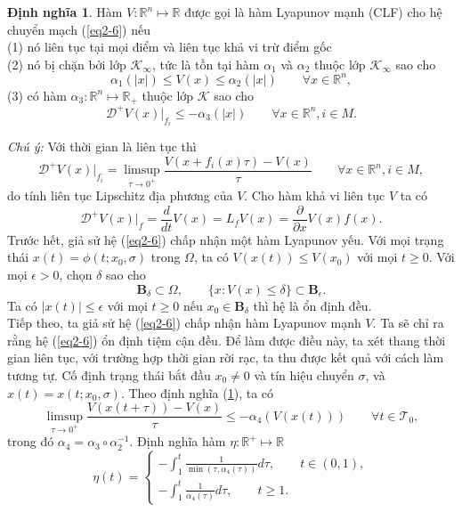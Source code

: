 \documentclass[14pt,a4paper,oneside]{report}		%
\theoremstyle{definition}
\newtheorem{define}[theorem]{Định nghĩa}
\begin{document}
\begin{define} \label{def2-4}
Hàm $V:\mathbb{R}^n\mapsto\mathbb{R}$ được gọi là hàm Lyapunov mạnh (CLF) cho hệ chuyển mạch (\ref{eq2-6}) nếu\\
(1) nó liên tục tại mọi điểm và liên tục khả vi trừ điểm gốc\\
(2) nó bị chặn bởi lớp $\mathcal{K}_\infty$, tức là tồn tại hàm $\alpha_1$ và $\alpha_2$ thuộc lớp $\mathcal{K}_\infty$ sao cho
$$\alpha_1(|x|)\leq V(x)\leq \alpha_2(|x|)\qquad\forall x\in\mathbb{R}^n,$$
(3) có hàm $\alpha_3: \mathbb{R}^n\mapsto\mathbb{R}_+$ thuộc lớp $\mathcal{K}$ sao cho
\begin{equation} \label{eq2-7}
\mathcal{D}^+V(x)|_{f_i}\leq -\alpha_3(|x|)\qquad\forall x\in\mathbb{R}^n, i\in M.
\end{equation}
\end{define}
\textit{Chú ý:} Với thời gian là liên tục thì
\begin{equation} \label{eq2-8}
\mathcal{D}^+V(x)|_{f_i}=\limsup_{\tau\rightarrow 0^+}\frac{V(x+f_i(x)\tau)-V(x)}{\tau}\qquad\forall x\in\mathbb{R}^n,i\in M,
\end{equation}
do tính liên tục Lipschitz địa phương của $V$. Cho hàm khả vi liên tục $V$ ta có
$$\mathcal{D}^+V(x)|_f=\frac{d}{dt}V(x)=L_fV(x)=\frac{\partial}{\partial x}V(x)f(x).$$
Trước hết, giả sử hệ (\ref{eq2-6}) chấp nhận một hàm Lyapunov yếu. Với mọi trạng thái $x(t)=\phi(t;x_0,\sigma)$ trong $\Omega$, ta có $V(x(t))\leq V(x_0)$ với mọi $t\geq 0$. Với mọi $\epsilon >0$, chọn $\delta$ sao cho
$$\mathbf{B}_\delta\subset\Omega , \qquad\{x:V(x)\leq\delta\}\subset\mathbf{B}_\epsilon .$$
Ta có $|x(t)|\leq\epsilon$ với mọi $t\geq 0$ nếu $x_0 \in\mathbf{B}_\delta$ thì hệ là ổn định đều.\\
Tiếp theo, ta giả sử hệ (\ref{eq2-6}) chấp nhận hàm Lyapunov mạnh $V$. Ta sẽ chỉ ra rằng hệ (\ref{eq2-6}) ổn định tiệm cận đều. Để làm được điều này, ta xét thang thời gian liên tục, với trường hợp thời gian rời rạc, ta thu được kết quả với cách làm tương tự. Cố định trạng thái bắt đầu $x_0 \neq 0$ và tín hiệu chuyển $\sigma$, và $x(t)=x(t;x_0,\sigma)$. Theo định nghĩa (\ref{def2-4}), ta có 
\begin{equation} \label{eq2-9}
\limsup_{\tau\rightarrow 0^+}\frac{V(x(t+\tau))-V(x)}{\tau}\leq -\alpha_4(V(x(t)))\qquad\forall t\in\mathcal{T}_0,
\end{equation}
trong đó $\alpha_4 = \alpha_3\circ\alpha_2^{-1}$. Định nghĩa hàm $\eta : \mathbb{R}^+\mapsto\mathbb{R}$
$$
\eta (t) = \left\{
\begin{array}{l}
-\int_1^t\frac{1}{\min(\tau,\alpha_4(\tau))}d\tau ,\qquad t\in (0,1),\\
-\int_1^t\frac{1}{\alpha_4(\tau)}d\tau , \qquad t\geq 1.
\end{array}\right.
$$
\end{document}
